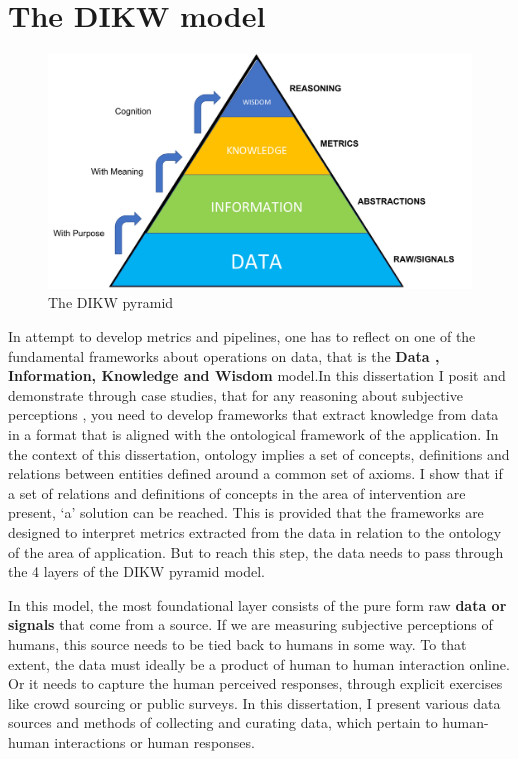 \section{The DIKW model}

\begin{figure}[t!]
    \centering
    \includegraphics[width=\columnwidth]{DIKW.pdf}
    \caption{The DIKW pyramid}
    \label{fig:dikw}
\end{figure}

In attempt to develop metrics and pipelines, one has to reflect on one of the fundamental frameworks about operations on data, that is the \textbf{Data , Information, Knowledge and Wisdom} model\cite{rowley2007wisdom}.In this dissertation I posit and demonstrate through case studies, that for any reasoning about subjective perceptions , you need to develop frameworks that extract knowledge from data in a format that is aligned with the ontological framework of the application. In the context of this dissertation, ontology implies a set of concepts, definitions and relations between entities defined around a common set of axioms. I show that if a set of relations and definitions of concepts in the area of intervention are present, `a' solution can be reached. This is provided that the frameworks are designed to interpret metrics extracted from the data in relation to the ontology of the area of application. But to reach this step, the data needs to pass through the 4 layers of the DIKW pyramid model.

In this model, the most foundational layer consists of the pure form raw \textbf{data or signals} that come from a source. If we are measuring subjective perceptions of humans, this source needs to be tied back to humans in some way. To that extent, the data must ideally be a product of human to human interaction online. Or it needs to capture the human perceived responses, through explicit exercises like crowd sourcing or public surveys. In this dissertation, I present various data sources and methods of collecting and curating data, which pertain to human-human interactions or human responses. 

